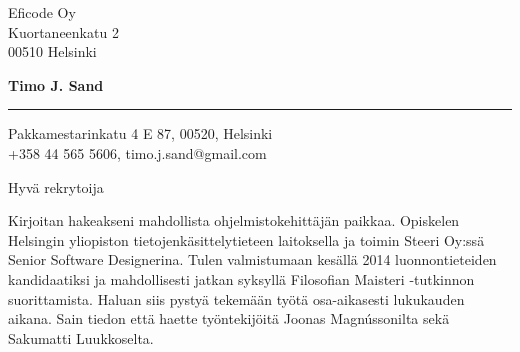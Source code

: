 \documentclass{letter} %
\begin{document}
\signature{Timo J. Sand}           %
\longindentation=0pt                       %
\let\raggedleft\raggedright                %


\begin{letter}{%
 Eficode Oy \\
Kuortaneenkatu 2 \\
00510 Helsinki
}

\begin{flushleft}
{\large\bf Timo J. Sand}
\end{flushleft}
\medskip\hrule height 1pt
\begin{flushright}
\hfill Pakkamestarinkatu 4 E 87, 00520, Helsinki \\
\hfill +358 44 565 5606, timo.j.sand@gmail.com
\end{flushright}
\vfill %


\opening{Hyvä rekrytoija}


\noindent
Kirjoitan hakeakseni mahdollista ohjelmistokehittäjän paikkaa.
Opiskelen Helsingin yliopiston tietojenkäsittelytieteen laitoksella ja toimin Steeri Oy:ssä Senior Software Designerina. Tulen valmistumaan kesällä 2014 luonnontieteiden kandidaatiksi ja mahdollisesti jatkan syksyllä Filosofian Maisteri -tutkinnon suorittamista. Haluan siis pystyä tekemään työtä osa-aikasesti lukukauden aikana. Sain tiedon että haette työntekijöitä Joonas Magnússonilta sekä Sakumatti Luukkoselta.


\noindent


\end{letter}
\end{document}
